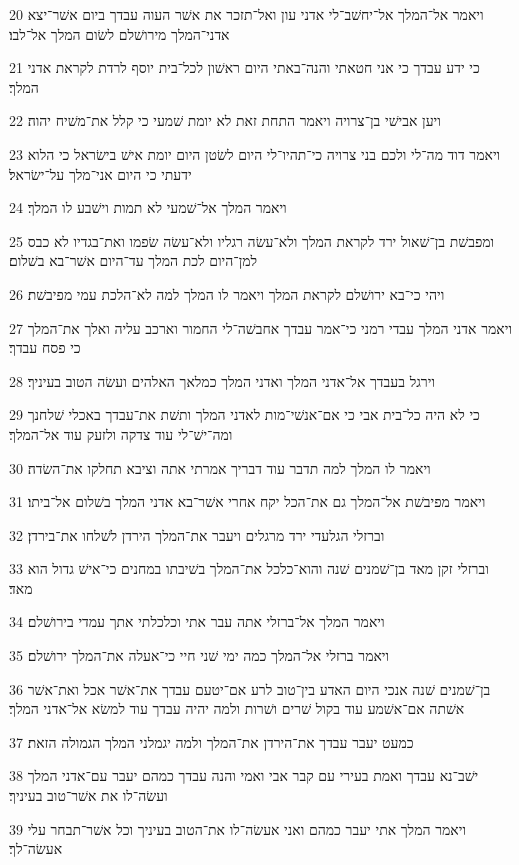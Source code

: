 \par 20 ויאמר אל־המלך אל־יחשׁב־לי אדני עון ואל־תזכר את אשׁר העוה עבדך ביום אשׁר־יצא אדני־המלך מירושׁלם לשׂום המלך אל־לבו׃
\par 21 כי ידע עבדך כי אני חטאתי והנה־באתי היום ראשׁון לכל־בית יוסף לרדת לקראת אדני המלך׃
\par 22 ויען אבישׁי בן־צרויה ויאמר התחת זאת לא יומת שׁמעי כי קלל את־משׁיח יהוה׃
\par 23 ויאמר דוד מה־לי ולכם בני צרויה כי־תהיו־לי היום לשׂטן היום יומת אישׁ בישׂראל כי הלוא ידעתי כי היום אני־מלך על־ישׂראל׃
\par 24 ויאמר המלך אל־שׁמעי לא תמות וישׁבע לו המלך׃
\par 25 ומפבשׁת בן־שׁאול ירד לקראת המלך ולא־עשׂה רגליו ולא־עשׂה שׂפמו ואת־בגדיו לא כבס למן־היום לכת המלך עד־היום אשׁר־בא בשׁלום׃
\par 26 ויהי כי־בא ירושׁלם לקראת המלך ויאמר לו המלך למה לא־הלכת עמי מפיבשׁת׃
\par 27 ויאמר אדני המלך עבדי רמני כי־אמר עבדך אחבשׁה־לי החמור וארכב עליה ואלך את־המלך כי פסח עבדך׃
\par 28 וירגל בעבדך אל־אדני המלך ואדני המלך כמלאך האלהים ועשׂה הטוב בעיניך׃
\par 29 כי לא היה כל־בית אבי כי אם־אנשׁי־מות לאדני המלך ותשׁת את־עבדך באכלי שׁלחנך ומה־ישׁ־לי עוד צדקה ולזעק עוד אל־המלך׃
\par 30 ויאמר לו המלך למה תדבר עוד דבריך אמרתי אתה וציבא תחלקו את־השׂדה׃
\par 31 ויאמר מפיבשׁת אל־המלך גם את־הכל יקח אחרי אשׁר־בא אדני המלך בשׁלום אל־ביתו׃
\par 32 וברזלי הגלעדי ירד מרגלים ויעבר את־המלך הירדן לשׁלחו את־בירדן׃
\par 33 וברזלי זקן מאד בן־שׁמנים שׁנה והוא־כלכל את־המלך בשׁיבתו במחנים כי־אישׁ גדול הוא מאד׃
\par 34 ויאמר המלך אל־ברזלי אתה עבר אתי וכלכלתי אתך עמדי בירושׁלם׃
\par 35 ויאמר ברזלי אל־המלך כמה ימי שׁני חיי כי־אעלה את־המלך ירושׁלם׃
\par 36 בן־שׁמנים שׁנה אנכי היום האדע בין־טוב לרע אם־יטעם עבדך את־אשׁר אכל ואת־אשׁר אשׁתה אם־אשׁמע עוד בקול שׁרים ושׁרות ולמה יהיה עבדך עוד למשׂא אל־אדני המלך׃
\par 37 כמעט יעבר עבדך את־הירדן את־המלך ולמה יגמלני המלך הגמולה הזאת׃
\par 38 ישׁב־נא עבדך ואמת בעירי עם קבר אבי ואמי והנה עבדך כמהם יעבר עם־אדני המלך ועשׂה־לו את אשׁר־טוב בעיניך׃
\par 39 ויאמר המלך אתי יעבר כמהם ואני אעשׂה־לו את־הטוב בעיניך וכל אשׁר־תבחר עלי אעשׂה־לך׃
